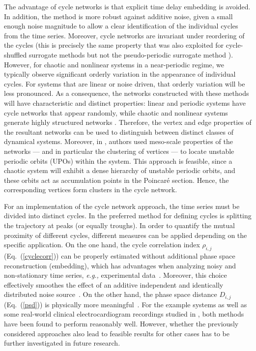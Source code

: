 		The advantage of cycle networks is that explicit time delay embedding is avoided. In addition, the method is more robust against additive noise, given a small enough noise magnitude to allow a clear identification of the individual cycles from the time series. Moreover, cycle networks are invariant under reordering of the cycles (this is precisely the same property that was also exploited for cycle-shuffled surrogate methods \cite{Theiler1996} but not the pseudo-periodic surrogate method \cite{Small2001}). However, for chaotic and nonlinear systems in a near-periodic regime, we typically observe significant orderly variation in the appearance of individual cycles. For systems that are linear or noise driven, that orderly variation will be less pronounced. As a consequence, the networks constructed with these methods will have characteristic and distinct properties: linear and periodic systems have cycle networks that appear randomly, while chaotic and nonlinear systems generate highly structured networks \cite{Zhang2006,Zhang2008e}. Therefore, the vertex and edge properties of the resultant networks can be used to distinguish between distinct classes of dynamical systems. Moreover, in \cite{Zhang2006b}, authors used meso-scale properties of the networks --- and in particular the clustering of vertices --- to locate unstable periodic orbits (UPOs) within the system. This approach is feasible, since a chaotic system will exhibit a dense hierarchy of unstable periodic orbits, and these orbits act as accumulation points in the Poincar\'e section. Hence, the corresponding vertices form clusters in the cycle network. 
		
		For an implementation of the cycle network approach, the time series must be divided into distinct cycles. In \cite{Zhang2006,Zhang2008} the preferred method for defining cycles is splitting the trajectory at peaks (or equally troughs). In order to quantify the mutual proximity of different cycles, different measures can be applied depending on the specific application. On the one hand, the cycle correlation index $\rho_{i,j}$ (Eq.~(\ref{cyclecorr})) can be properly estimated without additional phase space reconstruction (embedding), which has advantages when analyzing noisy and non-stationary time series, \textit{e.g.,} experimental data~\cite{Zhang2006}. Moreover, this choice effectively smoothes the effect of an additive independent and identically distributed noise source~\cite{Zhang2006b}. On the other hand, the phase space distance $D_{i,j}$ (Eq.~(\ref{psd})) is physically more meaningful~\cite{Zhang2008}. For the example systems as well as some real-world clinical electrocardiogram recordings studied in \cite{Zhang2006,Zhang2008}, both methods have been found to perform reasonably well. However, whether the previously considered approaches also lead to feasible results for other cases has to be further investigated in future research.

